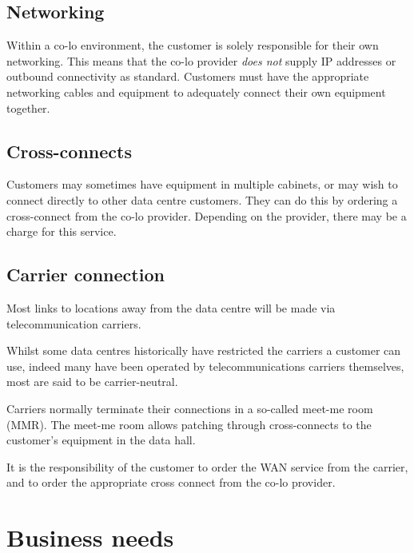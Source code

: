 \subsection{Networking}

Within a co-lo environment, the customer is solely responsible for their own networking.
This means that the co-lo provider \textit{does not} supply IP addresses or outbound connectivity as standard.
Customers must have the appropriate networking cables and equipment to adequately connect their own equipment together.

\subsection{Cross-connects}

Customers may sometimes have equipment in multiple cabinets, or may wish to connect directly to other data centre customers.
They can do this by ordering a cross-connect from the co-lo provider.
Depending on the provider, there may be a charge for this service.

\subsection{Carrier connection}

Most links to locations away from the data centre will be made via telecommunication carriers.

Whilst some data centres historically have restricted the carriers a customer can use, indeed many have been operated by telecommunications carriers themselves, most are said to be carrier-neutral.

Carriers normally terminate their connections in a so-called meet-me room (MMR).
The meet-me room allows patching through cross-connects to the customer's equipment in the data hall. 

It is the responsibility of the customer to order the WAN service from the carrier, and to order the appropriate cross connect from the co-lo provider.


\section{Business needs}

